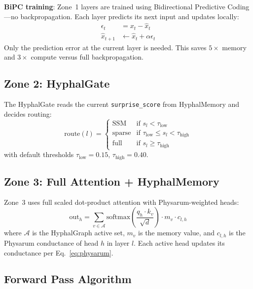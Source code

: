 \documentclass[11pt]{article}
\begin{document}
\textbf{BiPC training}: Zone~1 layers are trained using Bidirectional Predictive Coding---no backpropagation. Each layer predicts its next input and updates locally:
\begin{align}
  \epsilon_t &= x_t - \hat{x}_t \\
  \hat{x}_{t+1} &\leftarrow \hat{x}_t + \alpha \epsilon_t
\end{align}
Only the prediction error at the current layer is needed. This saves $5\times$ memory and $3\times$ compute versus full backpropagation.

\subsection{Zone 2: HyphalGate}

The HyphalGate reads the current \texttt{surprise\_score} from HyphalMemory and decides routing:
\begin{equation}
  \text{route}(l) = \begin{cases}
    \text{SSM}    & \text{if } s_l < \tau_\text{low} \\
    \text{sparse} & \text{if } \tau_\text{low} \leq s_l < \tau_\text{high} \\
    \text{full}   & \text{if } s_l \geq \tau_\text{high}
  \end{cases}
\end{equation}
with default thresholds $\tau_\text{low} = 0.15$, $\tau_\text{high} = 0.40$.

\subsection{Zone 3: Full Attention + HyphalMemory}

Zone~3 uses full scaled dot-product attention with Physarum-weighted heads:
\begin{equation}
  \text{out}_h = \sum_{v \in \mathcal{A}} \text{softmax}\!\left(\frac{q_h \cdot k_v}{\sqrt{d}}\right) \cdot m_v \cdot c_{l,h}
\end{equation}
where $\mathcal{A}$ is the HyphalGraph active set, $m_v$ is the memory value, and $c_{l,h}$ is the Physarum conductance of head $h$ in layer $l$. Each active head updates its conductance per Eq.~\ref{eq:physarum}.

\subsection{Forward Pass Algorithm}
\end{document}
